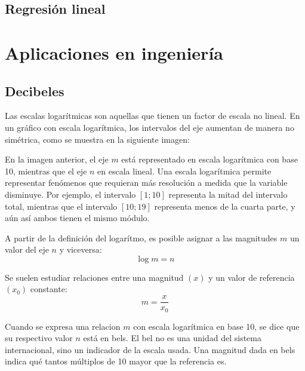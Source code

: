\documentclass[a5paper,12pt,twoside]{book}
\begin{document}
\section{Regresión lineal}



\appendix


\chapter{Aplicaciones en ingeniería}


\section{Decibeles}

Las escalas logarítmicas son aquellas que tienen un factor de escala no lineal.
En un gráfico con escala logarítmica, los intervalos del eje aumentan de manera no simétrica, como se muestra en la siguiente imagen:

\begin{center}
    \def\svgwidth{\linewidth}
    
\end{center}

En la imagen anterior, el eje $m$ está representado en escala logarítmica con base 10, mientras que el eje $n$ en escala lineal.
Una escala logarítmica permite representar fenómenos que requieran más resolución a medida que la variable disminuye.
Por ejemplo, el intervalo $[1;10]$ representa la mitad del intervalo total, mientras que el intervalo $[10;19]$ representa menos de la cuarta parte, y aún así ambos tienen el mismo módulo.

A partir de la definición del logarítmo, es posible asignar a las magnitudes $m$ un valor del eje $n$ y viceversa:
\begin{equation*}
    \log{m}=n
\end{equation*}

Se suelen estudiar relaciones entre una magnitud $(x)$ y un valor de referencia $(x_0)$ constante:
\begin{equation*}
    m=\frac{x}{x_0}
\end{equation*}

Cuando se expresa una relacion $m$ con escala logarítmica en base 10, se dice que su respectivo valor $n$ está en bels.
El bel no es una unidad del sistema internacional, sino un indicador de la escala usada.
Una magnitud dada en bels indica qué tantos múltiplos de 10 mayor que la referencia es.
\end{document}
